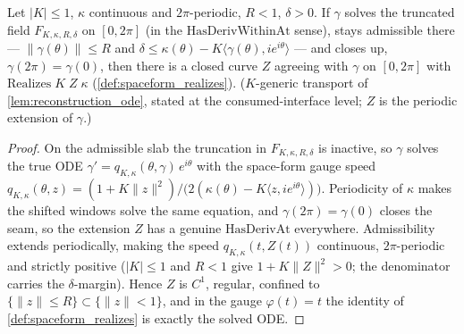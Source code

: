 \begin{lemma}
  \label{lem:spaceform_reconstruction}
  Let $|K|\le1$, $\kappa$ continuous and $2\pi$-periodic, $R<1$,
  $\delta>0$. If $\gamma$ solves the truncated field
  $F_{K,\kappa,R,\delta}$ on $[0,2\pi]$ (in the
  $\mathrm{HasDerivWithinAt}$ sense), stays admissible there —
  $\|\gamma(\theta)\|\le R$ and
  $\delta\le\kappa(\theta)-K\langle \gamma(\theta),ie^{i\theta}\rangle$ —
  and closes up, $\gamma(2\pi)=\gamma(0)$, then there is a closed curve $Z$ agreeing with
  $\gamma$ on $[0,2\pi]$ with $\mathrm{Realizes}\;K\;Z\;\kappa$
  (\cref{def:spaceform_realizes}). ($K$-generic transport of
  \cref{lem:reconstruction_ode}, stated at the consumed-interface level; $Z$ is
  the periodic extension of $\gamma$.)
\end{lemma}

\begin{proof}
  \leanok
  On the admissible slab the truncation in $F_{K,\kappa,R,\delta}$ is
  inactive, so $\gamma$ solves the true ODE
  $\gamma'=q_{K,\kappa}(\theta,\gamma)\,e^{i\theta}$ with the space-form gauge
  speed $q_{K,\kappa}(\theta,z)=(1+K\|z\|^2)/
  \bigl(2(\kappa(\theta)-K\langle z,ie^{i\theta}\rangle)\bigr)$.
  Periodicity of $\kappa$ makes the shifted windows solve the same equation, and
  $\gamma(2\pi)=\gamma(0)$ closes the seam, so the extension $Z$ has a genuine
  $\mathrm{HasDerivAt}$ everywhere. Admissibility extends periodically, making
  the speed $q_{K,\kappa}(t,Z(t))$ continuous, $2\pi$-periodic and
  strictly positive ($|K|\le1$ and $R<1$ give
  $1+K\|Z\|^2>0$; the denominator carries the $\delta$-margin). Hence
  $Z$ is $C^1$, regular, confined to $\{\|z\|\le R\}\subset\{\|z\|<1\}$, and in
  the gauge $\varphi(t)=t$ the identity of \cref{def:spaceform_realizes} is
  exactly the solved ODE.
\end{proof}

